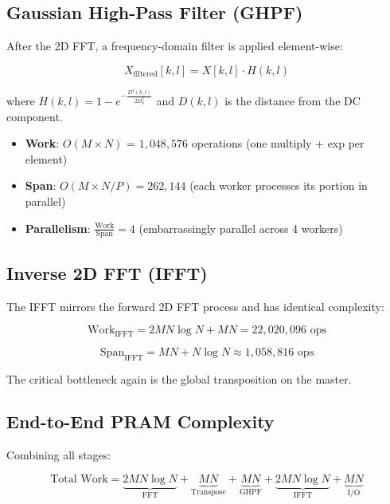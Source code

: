 \documentclass[11pt,a4paper]{article}
\theoremstyle{definition}
\begin{document}
\subsection{Gaussian High-Pass Filter (GHPF)}

After the 2D FFT, a frequency-domain filter is applied element-wise:

\[
X_{\text{filtered}}[k, l] = X[k, l] \cdot H(k, l)
\]

where $H(k, l) = 1 - e^{-\frac{D^2(k,l)}{2D_0^2}}$ and $D(k, l)$ is the distance from the DC component.

\begin{itemize}
    \item \textbf{Work}: $O(M \times N)$ = $1{,}048{,}576$ operations (one multiply + exp per element)
    \item \textbf{Span}: $O(M \times N / P) = 262{,}144$ (each worker processes its portion in parallel)
    \item \textbf{Parallelism}: $\frac{\text{Work}}{\text{Span}} = 4$ (embarrassingly parallel across 4 workers)
\end{itemize}

\subsection{Inverse 2D FFT (IFFT)}

The IFFT mirrors the forward 2D FFT process and has identical complexity:

\begin{equation}
\text{Work}_{\text{IFFT}} = 2MN \log N + MN = 22{,}020{,}096 \text{ ops}
\end{equation}

\begin{equation}
\text{Span}_{\text{IFFT}} = MN + N \log N \approx 1{,}058{,}816 \text{ ops}
\end{equation}

The critical bottleneck again is the global transposition on the master.

\subsection{End-to-End PRAM Complexity}

Combining all stages:

\begin{equation}
\text{Total Work} = \underbrace{2MN \log N}_{\text{FFT}} + \underbrace{MN}_{\text{Transpose}} + \underbrace{MN}_{\text{GHPF}} + \underbrace{2MN \log N}_{\text{IFFT}} + \underbrace{MN}_{\text{I/O}}
\end{equation}
\end{document}
